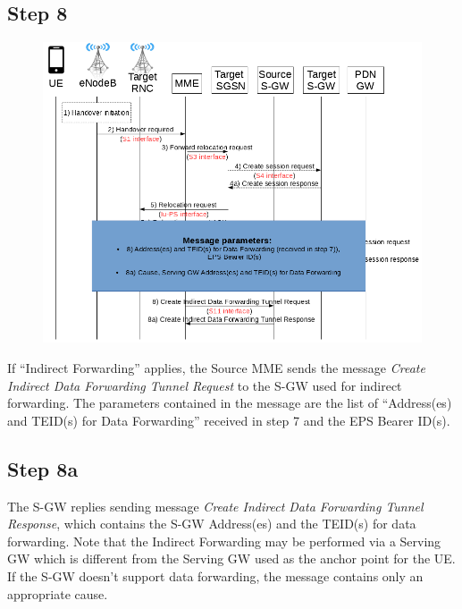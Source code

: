 \subsection*{Step 8}
\begin{figure}[!htb]
	\centering
	\includegraphics[width=0.9\linewidth]{img/8.png}
	\label{fig:8}
\end{figure}
If ``Indirect Forwarding'' applies, the Source MME sends the message \emph{Create
Indirect Data Forwarding Tunnel Request} to the S-GW used for indirect forwarding.
The parameters contained in the message are the list of ``Address(es) and TEID(s) for Data
Forwarding'' received in step 7 and the EPS Bearer ID(s).



\subsection*{Step 8a}
The S-GW replies sending message \emph{Create Indirect Data Forwarding Tunnel
Response}, which contains the S-GW Address(es) and the TEID(s) for data
forwarding. Note that the  Indirect Forwarding may be performed via a Serving GW
which is different from the Serving GW used as the anchor point for the UE.
If the S-GW doesn't support data forwarding, the message contains only an appropriate
cause.
